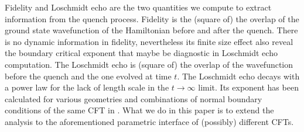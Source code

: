 Fidelity and Loschmidt echo are the two quantities we compute to extract information from the quench process. Fidelity is the (square of) the overlap of the ground state wavefunction of the Hamiltonian before and after the quench. There is no dynamic information in fidelity, nevertheless its finite size effect also reveal the boundary critical exponent that maybe be diagnostic in Loschmidt echo computation. The Loschmidt echo is (square of) the overlap of the wavefunction before the quench and the one evolved at time $t$. The Loschmidt echo decays with a power law for the lack of length scale in the $t \rightarrow \infty$ limit. Its exponent has been calculated for various geometries and combinations of normal boundary conditions of the same CFT in . What we do in this paper is to extend the analysis to the aforementioned parametric interface of (possibly) different CFTs. 


